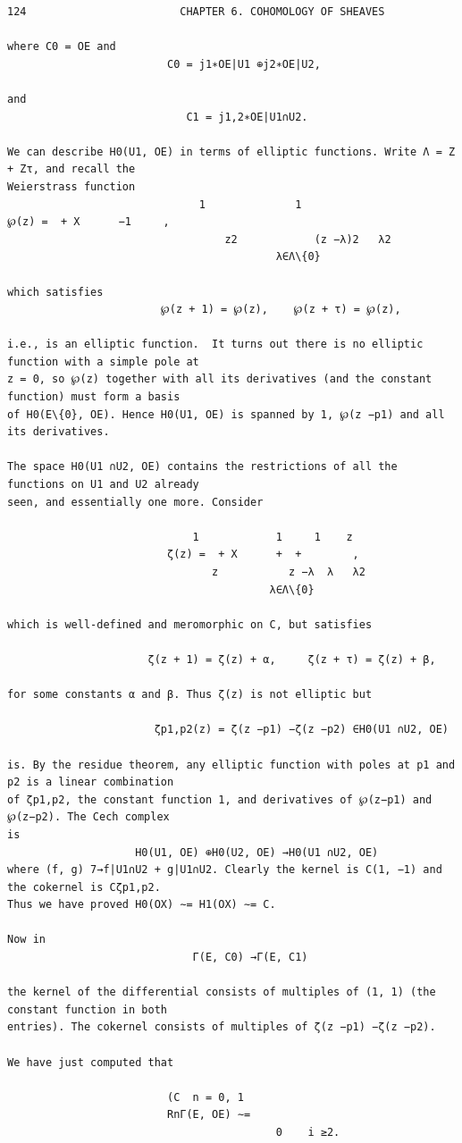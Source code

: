 \begin{Verbatim}[fontsize=\small]
124                        CHAPTER 6. COHOMOLOGY OF SHEAVES

where C0 = OE and
                         C0 = j1∗OE|U1 ⊕j2∗OE|U2,

and
                            C1 = j1,2∗OE|U1∩U2.

We can describe H0(U1, OE) in terms of elliptic functions. Write Λ = Z + Zτ, and recall the
Weierstrass function
                              1              1                        ℘(z) =  + X      −1     ,
                                  z2            (z −λ)2   λ2
                                          λ∈Λ\{0}

which satisfies
                        ℘(z + 1) = ℘(z),    ℘(z + τ) = ℘(z),

i.e., is an elliptic function.  It turns out there is no elliptic function with a simple pole at
z = 0, so ℘(z) together with all its derivatives (and the constant function) must form a basis
of H0(E\{0}, OE). Hence H0(U1, OE) is spanned by 1, ℘(z −p1) and all its derivatives.

The space H0(U1 ∩U2, OE) contains the restrictions of all the functions on U1 and U2 already
seen, and essentially one more. Consider

                             1            1     1    z
                         ζ(z) =  + X      +  +        ,
                                z           z −λ  λ   λ2
                                         λ∈Λ\{0}

which is well-defined and meromorphic on C, but satisfies

                      ζ(z + 1) = ζ(z) + α,     ζ(z + τ) = ζ(z) + β,

for some constants α and β. Thus ζ(z) is not elliptic but

                       ζp1,p2(z) = ζ(z −p1) −ζ(z −p2) ∈H0(U1 ∩U2, OE)

is. By the residue theorem, any elliptic function with poles at p1 and p2 is a linear combination
of ζp1,p2, the constant function 1, and derivatives of ℘(z−p1) and ℘(z−p2). The Cech complex
is
                    H0(U1, OE) ⊕H0(U2, OE) →H0(U1 ∩U2, OE)
where (f, g) 7→f|U1∩U2 + g|U1∩U2. Clearly the kernel is C(1, −1) and the cokernel is Cζp1,p2.
Thus we have proved H0(OX) ∼= H1(OX) ∼= C.

Now in
                             Γ(E, C0) →Γ(E, C1)

the kernel of the differential consists of multiples of (1, 1) (the constant function in both
entries). The cokernel consists of multiples of ζ(z −p1) −ζ(z −p2).

We have just computed that

                         (C  n = 0, 1
                         RnΓ(E, OE) ∼=
                                          0    i ≥2.
\end{Verbatim}

